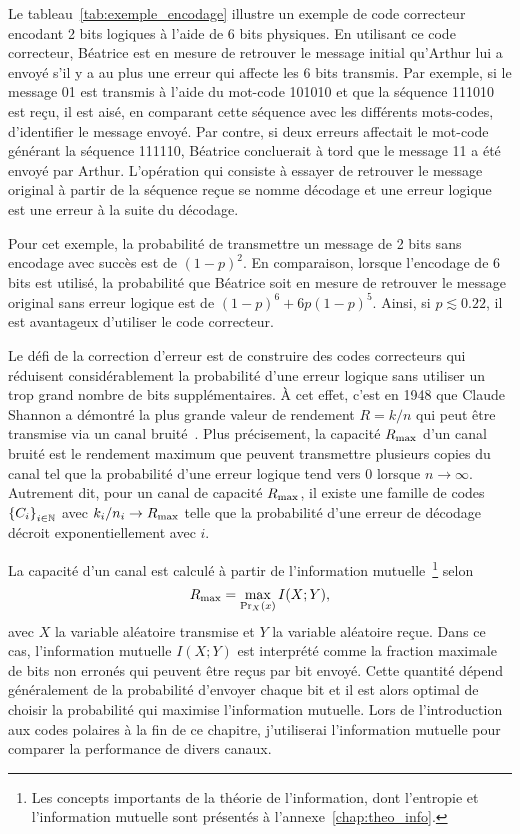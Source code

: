 Le tableau~\ref{tab:exemple_encodage} illustre un exemple de code correcteur
encodant 2 bits logiques à l'aide de 6 bits physiques.
En utilisant ce code correcteur,
Béatrice est en mesure de retrouver le message initial qu'Arthur lui a
envoyé s'il y a au plus une erreur qui affecte les 6 bits transmis. 
Par exemple, si le message 01 est transmis à l'aide du mot-code 
101010 et que la séquence 111010 est reçu, 
il est aisé, en comparant cette séquence avec les différents 
mots-codes, d'identifier le message envoyé. 
Par contre, 
si deux erreurs affectait le mot-code générant la séquence 111110, 
Béatrice concluerait à tord que le message 11 a été envoyé par Arthur.
L'opération qui consiste à essayer de retrouver le message original à partir
de la séquence reçue se nomme décodage 
et une erreur logique est une erreur à la suite du décodage.

Pour cet exemple,
la probabilité de transmettre un message de 2 bits sans encodage avec succès 
est de $(1 - p)^2$. 
En comparaison,
lorsque l'encodage de 6 bits est utilisé, 
la probabilité que Béatrice soit en mesure de retrouver le message original 
sans erreur logique est de $(1 - p)^6 + 6p(1 - p)^5$.
Ainsi, si $p \lesssim 0.22$, il est avantageux d'utiliser le code correcteur.

Le défi de la correction d'erreur est de construire des codes correcteurs 
qui réduisent considérablement la probabilité d'une erreur logique sans utiliser 
un trop grand nombre de bits supplémentaires.
À cet effet, c'est en 1948 que Claude Shannon a démontré la plus grande valeur 
de rendement $R = k/n$ qui peut être transmise 
via un canal bruité~\cite{shannon_mathematical_1948}.
Plus précisement,
la capacité $R_{\text{max}}$ d'un canal bruité est le rendement maximum 
que peuvent transmettre plusieurs copies du canal tel que la probabilité d'une 
erreur logique tend vers 0 lorsque $n \to \infty$.
Autrement dit,
pour un canal de capacité $R_{\text{max}}$, 
il existe une famille de codes $\qty{C_i}_{i\in\mathbb N}$ avec 
$k_i / n_i \to R_{\text{max}}$ telle que la probabilité d'une erreur de 
décodage décroit exponentiellement avec $i$.

La capacité d'un canal est calculé à partir de l'information mutuelle~\footnote{
  Les concepts importants de la théorie de l'information, dont l'entropie
  et l'information mutuelle sont présentés à l'annexe~\ref{chap:theo_info}.
} 
selon
\begin{equation}
  R_{\text{max}} = \max_{\Pr_X(x)} I(X ; Y),
\end{equation}
avec $X$ la variable aléatoire transmise et $Y$ la variable aléatoire reçue.
Dans ce cas,
l'information mutuelle $I(X ; Y)$ est interprété comme la fraction maximale
de bits non erronés qui peuvent être reçus par bit envoyé.
Cette quantité dépend généralement de la probabilité d'envoyer chaque bit
et il est alors optimal de choisir la probabilité qui maximise l'information mutuelle.
Lors de l'introduction aux codes polaires à la fin de ce chapitre,
j'utiliserai l'information mutuelle pour comparer la performance de divers canaux.

